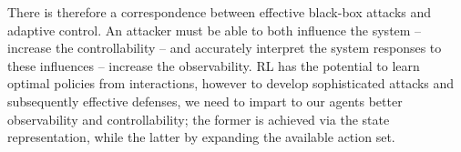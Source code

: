 There is therefore a correspondence between effective black-box attacks and adaptive control.
An attacker must be able to both influence the system -- increase the controllability -- and accurately interpret the system responses to these influences -- increase the observability.
\gls{RL} has the potential to learn optimal policies from interactions, however to develop sophisticated attacks and subsequently effective defenses, we need to impart to our agents better observability and controllability; the former is achieved via the state representation, while the latter by expanding the available action set.
